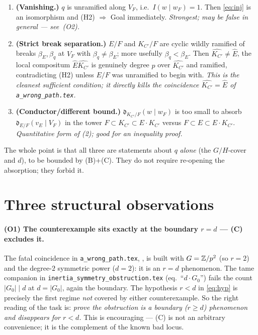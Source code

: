 \documentclass[11pt]{article}
\begin{document}
\begin{enumerate}
\item \textbf{(Vanishing.)} $q$ is unramified along $V_F$, i.e.\
      $I(w\mid w_F)=1$. Then \cref{eq:inj} is an isomorphism and (H2)
      $\Rightarrow$ Goal immediately. \emph{Strongest; may be false in general
      --- see \Cref{sec:obs}\,(O2).}
\item \textbf{(Strict break separation.)} $E/F$ and $K_{C'}/F$ are cyclic
      wildly ramified of breaks $\beta_E,\beta_q$ at $V_F$ with
      $\beta_q\neq\beta_E$; more usefully $\beta_q<\beta_E$. Then
      $\widehat{K_{C'}}\neq\widehat E$, the local compositum
      $\widehat E\widehat{K_{C'}}$ is genuinely degree $p$ over
      $\widehat{K_{C'}}$ and ramified, contradicting (H2) unless $E/F$ was
      unramified to begin with. \emph{This is the cleanest sufficient
      condition; it directly kills the coincidence $\widehat{K_{C'}}=\widehat E$
      of \texttt{a\_wrong\_path.tex}.}
\item \textbf{(Conductor/different bound.)} $\mathfrak d_{K_{C'}/F}(w\mid w_F)$
      is too small to absorb $\mathfrak d_{E/F}(v_E\mid V_F)$ in the tower
      $F\subset K_{C'}\subset E\cdot K_{C'}$ versus $F\subset E\subset
      E\cdot K_{C'}$. \emph{Quantitative form of (2); good for an inequality
      proof.}
\end{enumerate}

\noindent The whole point is that all three are statements about $q$ \emph{alone}
(the $G/H$-cover and $d$), to be bounded by (B)+(C). They do not require
re-opening the absorption; they forbid it.

\section{Three structural observations}\label{sec:obs}

\paragraph{(O1) The counterexample sits exactly at the boundary $r=d$ --- (C)
excludes it.}
The fatal coincidence in \texttt{a\_wrong\_path.tex},
, is built with $G=\mathbb{Z}/p^2$ (so $r=2$) and the
degree-$2$ symmetric power ($d=2$): it is an $r=d$ phenomenon. The tame
companion in \texttt{inertia\_symmetry\_obstruction.tex} (eq.~``$d\cdot G_0$'')
fails the count $|G_0|\mid d$ at $d=|G_0|$, again the boundary. The hypothesis
$r<d$ in \cref{eq:hyp} is precisely the first regime \emph{not} covered by
either counterexample. So the right reading of the task is: \emph{prove the
obstruction is a boundary ($r\ge d$) phenomenon and disappears for $r<d$.}
This is encouraging --- (C) is not an arbitrary convenience; it is the
complement of the known bad locus.
\end{document}
